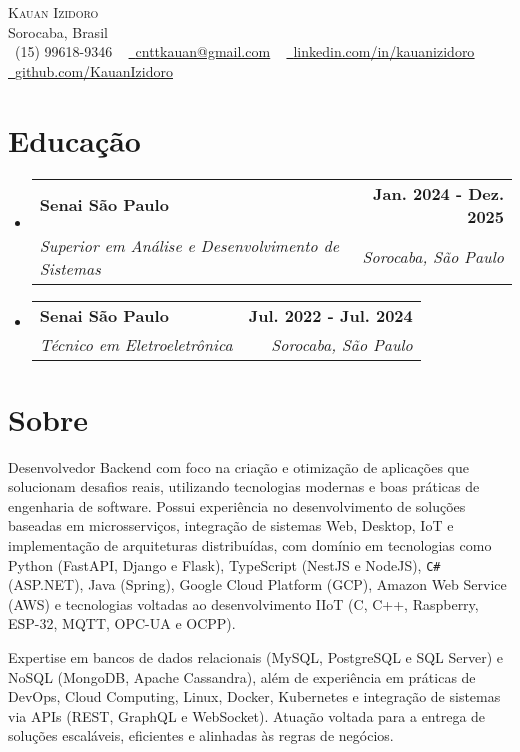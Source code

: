 \documentclass[letterpaper,11pt]{article}
\makeatletter
\newcommand{\resumeSubheading}[4]{
  \vspace{-2pt}\item
    \begin{tabular*}{1.0\textwidth}[t]{l@{\extracolsep{\fill}}r}
      \textbf{#1} & \textbf{\small #2} \\
      \textit{\small#3} & \textit{\small #4} \\
    \end{tabular*}\vspace{-7pt}
}
\newcommand{\resumeSubHeadingListStart}{\begin{itemize}[leftmargin=0.0in, label={}]}
\newcommand{\resumeSubHeadingListEnd}{\end{itemize}}
\makeatother
\begin{document}

\begin{center}
    {\Huge \scshape Kauan Izidoro} \\ \vspace{1pt}
    Sorocaba, Brasil \\ \vspace{1pt}
    \small \raisebox{-0.1\height}\faPhone\ (15) 99618-9346 ~ \href{mailto:x@gmail.com}{\raisebox{-0.2\height}\faEnvelope\  \underline{cnttkauan@gmail.com}} ~ 
    \href{https://linkedin.com/in//}{\raisebox{-0.2\height}\faLinkedin\ \underline{linkedin.com/in/kauanizidoro}}  ~
    \href{https://github.com/}{\raisebox{-0.2\height}\faGithub\ \underline{github.com/KauanIzidoro}}
    \vspace{-8pt}
\end{center}


\section{Educação}
  \resumeSubHeadingListStart
    \resumeSubheading
      {Senai São Paulo}{Jan. 2024 - Dez. 2025}
      {Superior em Análise e Desenvolvimento de Sistemas}{Sorocaba, São Paulo}
      \resumeSubheading
      {Senai São Paulo}{Jul. 2022 - Jul. 2024}
      {Técnico em Eletroeletrônica}{Sorocaba, São Paulo}
  \resumeSubHeadingListEnd

\section{Sobre}
    \resumeSubHeadingListStart
        \small{Desenvolvedor Backend com foco na criação e otimização de aplicações que solucionam desafios reais, utilizando tecnologias modernas e boas práticas de engenharia de software. Possui experiência no desenvolvimento de soluções baseadas em microsserviços, integração de sistemas Web, Desktop, IoT e implementação de arquiteturas distribuídas, com domínio em tecnologias como Python (FastAPI, Django e Flask), TypeScript (NestJS e NodeJS), \texttt{C\#} (ASP.NET), Java (Spring), Google Cloud Platform (GCP), Amazon Web Service (AWS) e tecnologias voltadas ao desenvolvimento IIoT (C, C++, Raspberry, ESP-32, MQTT, OPC-UA e OCPP).

        Expertise em bancos de dados relacionais (MySQL, PostgreSQL e SQL Server) e NoSQL (MongoDB, Apache Cassandra), além de experiência em práticas de DevOps, Cloud Computing, Linux, Docker, Kubernetes e integração de sistemas via APIs (REST, GraphQL e WebSocket). Atuação voltada para a entrega de soluções escaláveis, eficientes e alinhadas às regras de negócios.
        }
   \resumeSubHeadingListEnd
\end{document}

